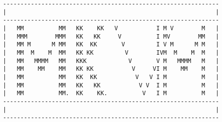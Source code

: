 \documentclass[10pt,landscape,a4paper]{article}
\begin{document}
\begin{multicols}{3}
\begin{Verbatim}
--------------------------------------------------------------
|                                                            |
--------------------------------------------------------------
|   MM          MM   KK    KK   V           I M V        M   |
|   MMM        MMM   KK   KK     V          I MV        MM   |
|   MM M      M MM   KK  KK       V         I V M      M M   |
|   MM  M    M  MM   KK KK         V        IVM  M    M  M   |
|   MM   MMMM   MM   KKK            V       V M   MMMM   M   |
|   MM    MM    MM   KK KK           V     VI M    MM    M   |
|   MM          MM   KK  KK           V   V I M          M   |
|   MM          MM   KK   KK           V V  I M          M   |
|   MM          MM.  KK    KK.          V   I M          M   |
--------------------------------------------------------------
|                                                            |
--------------------------------------------------------------
\end{Verbatim}
\end{multicols}
\end{document}

